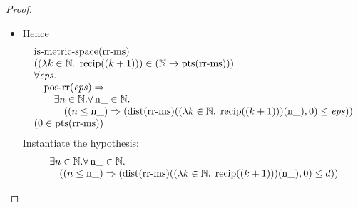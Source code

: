 \documentclass[11pt]{article}
\theoremstyle{plain}
\begin{document}
\begin{proof}
\begin{itemize}[leftmargin=2.8em, itemsep=4pt, parsep=1pt]
  \item[\textbf{5--8}] Hence 
\begin{equation*}
\begin{array}{@{}l@{}}
\operatorname{is\text{-}metric\text{-}space}(\operatorname{rr\text{-}ms}) \\
((\lambda k \in \mathbb{N}.\; \operatorname{recip}((k + 1))) \in (\mathbb{N} \to \operatorname{pts}(\operatorname{rr\text{-}ms}))) \\
\begin{array}{@{}l@{}} \forall \mathit{eps}. \\ \quad \operatorname{pos\text{-}rr}(\mathit{eps}) \Rightarrow  \\ \quad \quad \exists n \in \mathbb{N}. \forall \operatorname{n\_} \in \mathbb{N}. \\ \quad \quad \quad ((n \leq \operatorname{n\_}) \Rightarrow (\operatorname{dist}(\operatorname{rr\text{-}ms})((\lambda k \in \mathbb{N}.\; \operatorname{recip}((k + 1)))(\operatorname{n\_}), 0) \leq \mathit{eps})) \end{array} \\
(0 \in \operatorname{pts}(\operatorname{rr\text{-}ms}))
\end{array}
\end{equation*}
Instantiate the hypothesis:
\begin{equation*}
\begin{array}{@{}l@{}} \exists n \in \mathbb{N}. \forall \operatorname{n\_} \in \mathbb{N}. \\ \quad ((n \leq \operatorname{n\_}) \Rightarrow (\operatorname{dist}(\operatorname{rr\text{-}ms})((\lambda k \in \mathbb{N}.\; \operatorname{recip}((k + 1)))(\operatorname{n\_}), 0) \leq d)) \end{array}
\end{equation*}


\end{itemize}
\end{proof}
\end{document}
